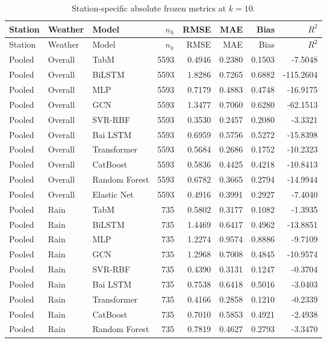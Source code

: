 \begingroup
\renewcommand{\thetable}{S2}
\small
\setlength{\tabcolsep}{5pt}
\begin{longtable}{lllrrrrr}
\caption{Station-specific absolute frozen metrics at $k=10$.}\label{tab:TableS02}\\
\toprule
Station & Weather & Model & $n_h$ & RMSE & MAE & Bias & $R^2$ \\
\midrule
\endfirsthead
\toprule
Station & Weather & Model & $n_h$ & RMSE & MAE & Bias & $R^2$ \\
\midrule
\endhead
Pooled & Overall & TabM & 5593 & 0.4946 & 0.2380 & 0.1503 & -7.5048 \\
Pooled & Overall & BiLSTM & 5593 & 1.8286 & 0.7265 & 0.6882 & -115.2604 \\
Pooled & Overall & MLP & 5593 & 0.7179 & 0.4883 & 0.4748 & -16.9175 \\
Pooled & Overall & GCN & 5593 & 1.3477 & 0.7060 & 0.6280 & -62.1513 \\
Pooled & Overall & SVR-RBF & 5593 & 0.3530 & 0.2457 & 0.2080 & -3.3321 \\
Pooled & Overall & Bai LSTM & 5593 & 0.6959 & 0.5756 & 0.5272 & -15.8398 \\
Pooled & Overall & Transformer & 5593 & 0.5684 & 0.2686 & 0.1752 & -10.2323 \\
Pooled & Overall & CatBoost & 5593 & 0.5836 & 0.4425 & 0.4218 & -10.8413 \\
Pooled & Overall & Random Forest & 5593 & 0.6782 & 0.3665 & 0.2794 & -14.9944 \\
Pooled & Overall & Elastic Net & 5593 & 0.4916 & 0.3991 & 0.2927 & -7.4040 \\
\midrule
Pooled & Rain & TabM & 735 & 0.5802 & 0.3177 & 0.1082 & -1.3935 \\
Pooled & Rain & BiLSTM & 735 & 1.4469 & 0.6417 & 0.4962 & -13.8851 \\
Pooled & Rain & MLP & 735 & 1.2274 & 0.9574 & 0.8886 & -9.7109 \\
Pooled & Rain & GCN & 735 & 1.2968 & 0.7008 & 0.4845 & -10.9574 \\
Pooled & Rain & SVR-RBF & 735 & 0.4390 & 0.3131 & 0.1247 & -0.3704 \\
Pooled & Rain & Bai LSTM & 735 & 0.7538 & 0.6418 & 0.5016 & -3.0403 \\
Pooled & Rain & Transformer & 735 & 0.4166 & 0.2858 & 0.1210 & -0.2339 \\
Pooled & Rain & CatBoost & 735 & 0.7010 & 0.5853 & 0.4921 & -2.4938 \\
Pooled & Rain & Random Forest & 735 & 0.7819 & 0.4627 & 0.2793 & -3.3470 \\

\end{longtable}
